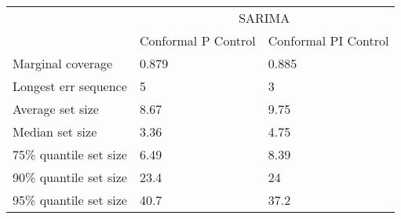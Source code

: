 \begin{tabular}{lll}
\toprule
& \multicolumn{2}{c}{SARIMA} \\
& Conformal P Control & Conformal PI Control \\
\midrule
Marginal coverage & 0.879 & 0.885 \\
Longest err sequence & 5 & 3 \\
Average set size & 8.67 & 9.75 \\
Median set size & 3.36 & 4.75 \\
75\% quantile set size & 6.49 & 8.39 \\
90\% quantile set size & 23.4 & 24 \\
95\% quantile set size & 40.7 & 37.2 \\
\bottomrule
\end{tabular}
